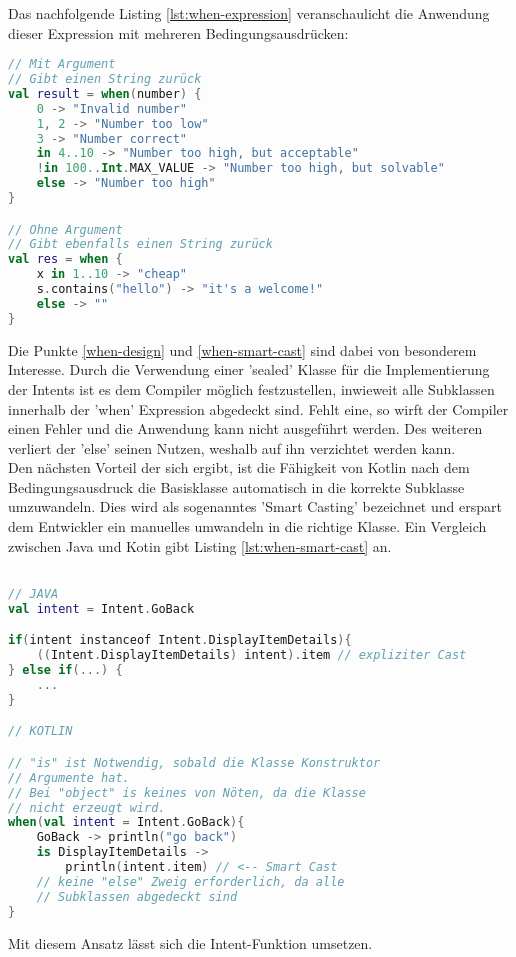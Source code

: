 Das nachfolgende Listing
\ref{lst:when-expression}
veranschaulicht die Anwendung dieser Expression mit mehreren Bedingungsausdrücken:
\begin{lstlisting}[caption={When Expression}, label={lst:when-expression}, language=Kotlin]
// Mit Argument
// Gibt einen String zurück
val result = when(number) {
	0 -> "Invalid number"
	1, 2 -> "Number too low"
	3 -> "Number correct"
	in 4..10 -> "Number too high, but acceptable"
	!in 100..Int.MAX_VALUE -> "Number too high, but solvable"
	else -> "Number too high"
}

// Ohne Argument
// Gibt ebenfalls einen String zurück
val res = when {
	x in 1..10 -> "cheap"
	s.contains("hello") -> "it's a welcome!"
	else -> ""
}
\end{lstlisting}
\bigskip
Die Punkte
\ref{when-design}
und
\ref{when-smart-cast}
sind dabei von besonderem Interesse. Durch die Verwendung einer 'sealed' Klasse für die Implementierung der Intents ist es dem Compiler möglich festzustellen, inwieweit alle Subklassen innerhalb der 'when' Expression abgedeckt sind. Fehlt eine, so wirft der Compiler einen Fehler und die Anwendung kann nicht ausgeführt werden. Des weiteren verliert der 'else' seinen Nutzen, weshalb auf ihn verzichtet werden kann.
\\
Den nächsten Vorteil der sich ergibt, ist die Fähigkeit von Kotlin nach dem Bedingungsausdruck die Basisklasse automatisch in die korrekte Subklasse umzuwandeln. Dies wird als sogenanntes 'Smart Casting' bezeichnet und erspart dem Entwickler ein manuelles umwandeln in die richtige Klasse.
Ein Vergleich zwischen Java und Kotin gibt Listing 
\ref{lst:when-smart-cast}
an.
\begin{lstlisting}[caption={'when' mit 'smart cast'}, label={lst:when-smart-cast}, language=Kotlin]

// JAVA
val intent = Intent.GoBack

if(intent instanceof Intent.DisplayItemDetails){
	((Intent.DisplayItemDetails) intent).item // expliziter Cast
} else if(...) { 
	... 
}

// KOTLIN

// "is" ist Notwendig, sobald die Klasse Konstruktor 
// Argumente hat.
// Bei "object" is keines von Nöten, da die Klasse 
// nicht erzeugt wird.
when(val intent = Intent.GoBack){
	GoBack -> println("go back")
	is DisplayItemDetails -> 
		println(intent.item) // <-- Smart Cast
	// keine "else" Zweig erforderlich, da alle 
	// Subklassen abgedeckt sind
}
\end{lstlisting}
\bigskip
Mit diesem Ansatz lässt sich die Intent-Funktion umsetzen.  
